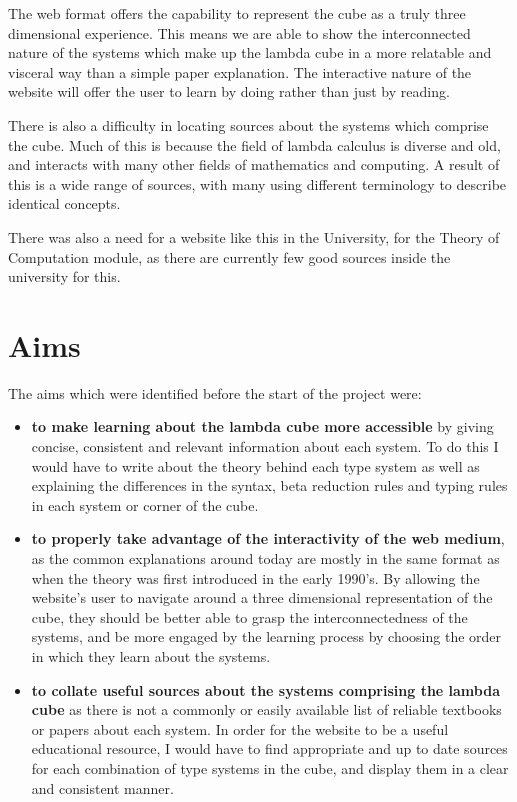 \documentclass{l4proj}
\begin{document}
The web format offers the capability to represent the cube as a truly three dimensional experience. This means we are able to show the interconnected nature of the systems which make up the lambda cube in a more relatable and visceral way than a simple paper explanation.  The interactive nature of the website will offer the user to learn by doing rather than just by reading.

There is also a difficulty in locating sources about the systems which comprise the cube.  Much of this is because the field of lambda calculus is diverse and old, and interacts with many other fields of mathematics and computing.  A result of this is a wide range of sources, with many using different terminology to describe identical concepts.

There was also a need for a website like this in the University, for the Theory of Computation module, as there are currently few good sources inside the university for this.

\section{Aims}

The aims which were identified before the start of the project were: 
\begin{itemize}
    \item
    \textbf{to make learning about the lambda cube more accessible} by giving concise, consistent and relevant information about each system.  To do this I would have to write about the theory behind each type system as well as explaining the differences in the syntax, beta reduction rules and typing rules in each system or corner of the cube.

    \item
    \textbf{to properly take advantage of the interactivity of the web medium}, as the common explanations around today are mostly in the same format as when the theory was first introduced in the early 1990's.  By allowing the website's user to navigate around a three dimensional representation of the cube, they should be better able to grasp the interconnectedness of the systems, and be more engaged by the learning process by choosing the order in which they learn about the systems.

    \item
    \textbf{to collate useful sources about the systems comprising the lambda cube} as there is not a commonly or easily available list of reliable textbooks or papers about each system.  In order for the website to be a useful educational resource, I would have to find appropriate and up to date sources for each combination of type systems in the cube, and display them in a clear and consistent manner.
\end{itemize}
\end{document}
